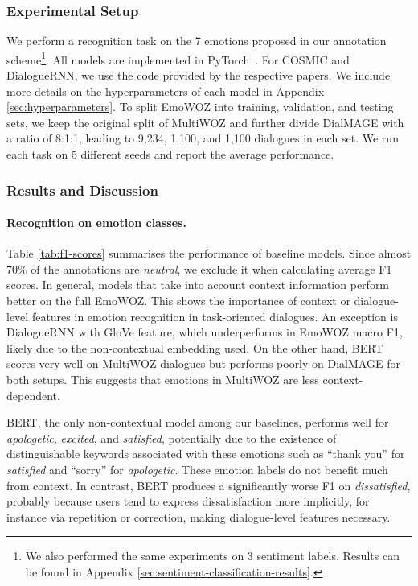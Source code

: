 \documentclass[10pt, a4paper]{article}
\begin{document}
\subsubsection{Experimental Setup}
We perform a recognition task on the 7 emotions proposed in our annotation scheme\footnote{We also performed the same experiments on 3 sentiment labels. Results can be found in Appendix \ref{sec:sentiment-classification-results}.}.
All models are implemented in PyTorch~\cite{NEURIPS2019_9015}.
For COSMIC and DialogueRNN, we use the code provided by the respective papers. 
We include more details on the hyperparameters of each model in Appendix \ref{sec:hyperparameters}.
To split EmoWOZ into training, validation, and testing sets, we keep the original split of MultiWOZ and further divide DialMAGE with a ratio of 8:1:1, leading to 9,234, 1,100, and 1,100 dialogues in each set. We run each task on 5 different seeds and report the average performance.


\subsubsection{Results and Discussion}
\label{sec:results-and-discussion}
\paragraph{Recognition on emotion classes.} Table \ref{tab:f1-scores} summarises the performance of baseline models. Since almost 70\% of the annotations are \textit{neutral}, we exclude it when calculating average F1 scores. In general, models that take into account context information perform better on the full EmoWOZ. This shows the importance of context or dialogue-level features in emotion recognition in task-oriented dialogues. An exception is DialogueRNN with GloVe feature, which underperforms in EmoWOZ macro F1, likely due to the non-contextual embedding used. On the other hand, BERT scores very well on MultiWOZ dialogues but performs poorly on DialMAGE for both setups. This suggests that emotions in MultiWOZ are less context-dependent.\par

BERT, the only non-contextual model among our baselines, performs well for \textit{apologetic}, \textit{excited}, and \textit{satisfied}, potentially due to the existence of distinguishable keywords associated with these emotions such as ``thank you'' for \textit{satisfied} and ``sorry'' for \textit{apologetic}. These emotion labels do not benefit much from context. 
In contrast, BERT produces a significantly worse F1 on \textit{dissatisfied}, probably because users tend to express dissatisfaction more implicitly, for instance via repetition or correction, making dialogue-level features necessary.
\end{document}
